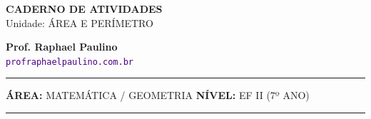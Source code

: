\documentclass[twoside, 10pt, a4paper]{article}
\begin{document}
\thispagestyle{empty}
\color{Cinzablack}
\vspace*{-1.8cm}

\noindent
\begin{minipage}{\textwidth}
    \selectfont
    \noindent
    \begin{minipage}[t]{0.70\linewidth}
        {\Large \bfseries \MakeUppercase{Caderno de Atividades}}\\[0.1cm]
        {\large \textmd{\textcolor{CinzaEscuro}{Unidade: ÁREA E PERÍMETRO}}}
    \end{minipage}%
    \begin{minipage}[t]{0.30\linewidth}
        \raggedleft
        \small \textbf{Prof. Raphael Paulino}\\
        \textsf{\small \textcolor{indigo}{\texttt{profraphaelpaulino.com.br}}}
    \end{minipage}
    
    \vspace{0.15cm}
    \noindent\rule{\linewidth}{1.2pt}
    \vspace{-0.1cm}
    \footnotesize\textsf{\textbf{ÁREA:} MATEMÁTICA / GEOMETRIA \hfill \textbf{NÍVEL:} EF II (7º ANO)}
    \vspace{0.1cm}
    \noindent\rule{\linewidth}{0.4pt}
\end{minipage}
\end{document}
